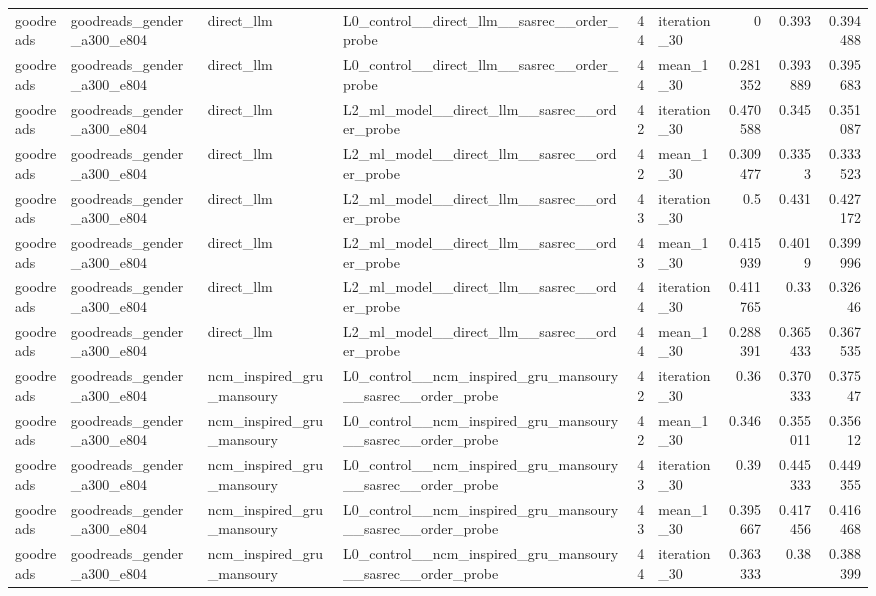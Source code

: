 \begin{table}[htbp!]
\begin{tabular}{llllrlrrr}
goodreads & goodreads\_gender\_a300\_e804 & direct\_llm & L0\_control\_\_direct\_llm\_\_sasrec\_\_order\_probe & 44 & iteration\_30 & 0 & 0.393 & 0.394488 \\
goodreads & goodreads\_gender\_a300\_e804 & direct\_llm & L0\_control\_\_direct\_llm\_\_sasrec\_\_order\_probe & 44 & mean\_1\_30 & 0.281352 & 0.393889 & 0.395683 \\
goodreads & goodreads\_gender\_a300\_e804 & direct\_llm & L2\_ml\_model\_\_direct\_llm\_\_sasrec\_\_order\_probe & 42 & iteration\_30 & 0.470588 & 0.345 & 0.351087 \\
goodreads & goodreads\_gender\_a300\_e804 & direct\_llm & L2\_ml\_model\_\_direct\_llm\_\_sasrec\_\_order\_probe & 42 & mean\_1\_30 & 0.309477 & 0.3353 & 0.333523 \\
goodreads & goodreads\_gender\_a300\_e804 & direct\_llm & L2\_ml\_model\_\_direct\_llm\_\_sasrec\_\_order\_probe & 43 & iteration\_30 & 0.5 & 0.431 & 0.427172 \\
goodreads & goodreads\_gender\_a300\_e804 & direct\_llm & L2\_ml\_model\_\_direct\_llm\_\_sasrec\_\_order\_probe & 43 & mean\_1\_30 & 0.415939 & 0.4019 & 0.399996 \\
goodreads & goodreads\_gender\_a300\_e804 & direct\_llm & L2\_ml\_model\_\_direct\_llm\_\_sasrec\_\_order\_probe & 44 & iteration\_30 & 0.411765 & 0.33 & 0.32646 \\
goodreads & goodreads\_gender\_a300\_e804 & direct\_llm & L2\_ml\_model\_\_direct\_llm\_\_sasrec\_\_order\_probe & 44 & mean\_1\_30 & 0.288391 & 0.365433 & 0.367535 \\
goodreads & goodreads\_gender\_a300\_e804 & ncm\_inspired\_gru\_mansoury & L0\_control\_\_ncm\_inspired\_gru\_mansoury\_\_sasrec\_\_order\_probe & 42 & iteration\_30 & 0.36 & 0.370333 & 0.37547 \\
goodreads & goodreads\_gender\_a300\_e804 & ncm\_inspired\_gru\_mansoury & L0\_control\_\_ncm\_inspired\_gru\_mansoury\_\_sasrec\_\_order\_probe & 42 & mean\_1\_30 & 0.346 & 0.355011 & 0.35612 \\
goodreads & goodreads\_gender\_a300\_e804 & ncm\_inspired\_gru\_mansoury & L0\_control\_\_ncm\_inspired\_gru\_mansoury\_\_sasrec\_\_order\_probe & 43 & iteration\_30 & 0.39 & 0.445333 & 0.449355 \\
goodreads & goodreads\_gender\_a300\_e804 & ncm\_inspired\_gru\_mansoury & L0\_control\_\_ncm\_inspired\_gru\_mansoury\_\_sasrec\_\_order\_probe & 43 & mean\_1\_30 & 0.395667 & 0.417456 & 0.416468 \\
goodreads & goodreads\_gender\_a300\_e804 & ncm\_inspired\_gru\_mansoury & L0\_control\_\_ncm\_inspired\_gru\_mansoury\_\_sasrec\_\_order\_probe & 44 & iteration\_30 & 0.363333 & 0.38 & 0.388399 \\

\end{tabular}
\end{table}
